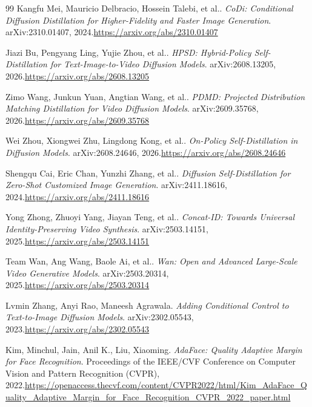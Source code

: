 \documentclass{article}
\begin{document}
\begin{thebibliography}{99}
Kangfu Mei, Mauricio Delbracio, Hossein Talebi, et al.. \emph{CoDi: Conditional Diffusion Distillation for Higher-Fidelity and Faster Image Generation}. arXiv:2310.01407, 2024.\newline\url{https://arxiv.org/abs/2310.01407}

Jiazi Bu, Pengyang Ling, Yujie Zhou, et al.. \emph{HPSD: Hybrid-Policy Self-Distillation for Text-Image-to-Video Diffusion Models}. arXiv:2608.13205, 2026.\newline\url{https://arxiv.org/abs/2608.13205}

Zimo Wang, Junkun Yuan, Angtian Wang, et al.. \emph{PDMD: Projected Distribution Matching Distillation for Video Diffusion Models}. arXiv:2609.35768, 2026.\newline\url{https://arxiv.org/abs/2609.35768}

Wei Zhou, Xiongwei Zhu, Lingdong Kong, et al.. \emph{On-Policy Self-Distillation in Diffusion Models}. arXiv:2608.24646, 2026.\newline\url{https://arxiv.org/abs/2608.24646}

Shengqu Cai, Eric Chan, Yunzhi Zhang, et al.. \emph{Diffusion Self-Distillation for Zero-Shot Customized Image Generation}. arXiv:2411.18616, 2024.\newline\url{https://arxiv.org/abs/2411.18616}

Yong Zhong, Zhuoyi Yang, Jiayan Teng, et al.. \emph{Concat-ID: Towards Universal Identity-Preserving Video Synthesis}. arXiv:2503.14151, 2025.\newline\url{https://arxiv.org/abs/2503.14151}

Team Wan, Ang Wang, Baole Ai, et al.. \emph{Wan: Open and Advanced Large-Scale Video Generative Models}. arXiv:2503.20314, 2025.\newline\url{https://arxiv.org/abs/2503.20314}

Lvmin Zhang, Anyi Rao, Maneesh Agrawala. \emph{Adding Conditional Control to Text-to-Image Diffusion Models}. arXiv:2302.05543, 2023.\newline\url{https://arxiv.org/abs/2302.05543}

Kim, Minchul, Jain, Anil K., Liu, Xiaoming. \emph{AdaFace: Quality Adaptive Margin for Face Recognition}. Proceedings of the IEEE/CVF Conference on Computer Vision and Pattern Recognition (CVPR), 2022.\newline\url{https://openaccess.thecvf.com/content/CVPR2022/html/Kim_AdaFace_Quality_Adaptive_Margin_for_Face_Recognition_CVPR_2022_paper.html}


\end{thebibliography}
\end{document}

